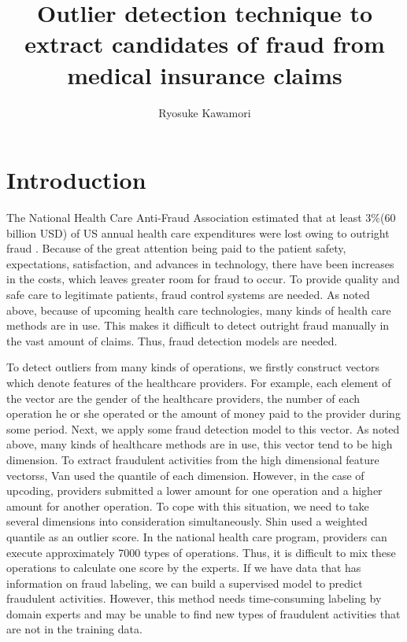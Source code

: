 \documentclass[dvipdfmx, english]{ampmt}             %
\title[Outlier detection technique to extract candidates of fraud from medical insurance claims]
      {Outlier detection technique to extract candidates of fraud from medical insurance claims}
\author{Ryosuke Kawamori}
\begin{document}
\ifoutputbody
\makeinsidecover                %
\makeabstract                   %
\maketoc                        %
\setcounter{page}{1}

\section{Introduction}
The National Health Care Anti-Fraud Association estimated that at least 3$\%$(60 billion USD) of US annual health care expenditures were lost owing to outright fraud \cite{Survey}. 
Because of the great attention being paid to the patient safety, expectations, satisfaction, and advances in technology, there have been increases in the costs, which leaves greater room for fraud to occur\cite{Dean}.
To provide quality and safe care to legitimate patients, fraud control systems are needed. As noted above, because of upcoming health care technologies, many kinds of health care methods are in use. This makes it difficult to detect outright fraud manually in the vast amount of claims.
Thus, fraud detection models are needed.  \par
To detect outliers from many kinds of operations, we firstly construct vectors which denote features of the healthcare providers. For example, each element of the vector are the gender of the healthcare providers, the number of  each operation he or she operated or the amount of money paid to the provider during some period. Next, we apply
some fraud detection model to this vector. As noted above, many kinds of healthcare methods are in use, this vector tend to be high dimension. To extract fraudulent activities from the high dimensional feature vectorss, Van \cite{Van} used the quantile of each dimension. However, in the case of upcoding, providers submitted a lower amount for one operation and a higher amount for another operation. To cope with this situation, we need to take several dimensions into consideration simultaneously. Shin \cite{Shin} used a weighted quantile as an outlier score. In the national health care program, providers can execute approximately 7000 types of operations. Thus, it is difficult to mix these operations to calculate one score by the experts. If we have data that has information on fraud labeling, we can build a supervised model to predict fraudulent activities. However, this method needs time-consuming labeling by domain experts and may be unable to find new types of fraudulent activities that are not in the training data. 
\end{document}
